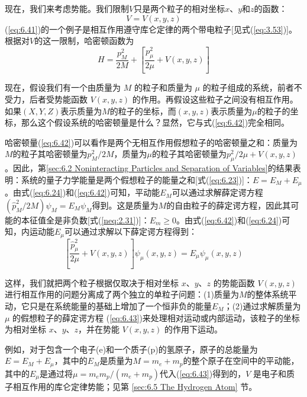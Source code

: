    现在，我们来考虑势能。我们限制$V$只是两个粒子的相对坐标$x$、$y$和$z$的函数：
    \begin{equation}
        V = V\left(x,y,z\right)
        \label{eq:6.41}
    \end{equation}
    (\ref{eq:6.41})的一个例子是相互作用遵守库仑定律的两个带电粒子[见式(\ref{eq:3.53})]。根据对$V$的这一限制，哈密顿函数为
    \begin{equation}
        H = \frac{p_M^2}{2M} + \left[\frac{p_{\mu}^2}{2\mu} + V\left(x,y,z\right)\right]
        \label{eq:6.42}
    \end{equation}

    现在，假设我们有一个由质量为 $M$ 的粒子和质量为 $\mu$ 的粒子组成的系统，前者不受力，后者受势能函数 $V\left(x,y,z\right)$ 的作用。再假设这些粒子之间没有相互作用。如果$\left(X,Y,Z\right)$表示质量为$M$的粒子的坐标，而$\left(x,y,z\right)$表示质量为$\mu$的粒子的坐标，那么这个假设系统的哈密顿量是什么？显然，它与式(\ref{eq:6.42})完全相同。

    哈密顿量(\ref{eq:6.42})可以看作是两个无相互作用假想粒子的哈密顿量之和：质量为$M$的粒子其哈密顿量为$p_M^2/2M$，质量为$\mu$的粒子其哈密顿量为$p_{\mu}^2/2\mu + V\left(x,y,z\right)$。因此，第\ref{sec:6.2 Noninteracting Particles and Separation of Variables}的结果表明：系统的量子力学能量是两个假想粒子的能量之和[式(\ref{eq:6.23})]：$E = E_M + E_{\mu}$。由式(\ref{eq:6.24})和(\ref{eq:6.42})可知，平动能$E_M$可以通过求解薛定谔方程$\left(\hat{p}_M^2/2M\right)\psi_M = E_M\psi_M$得到。这是质量为$M$的自由粒子的薛定谔方程，因此其可能的本征值全是非负数[式(\ref{neq:2.31})]：$E_m \ge 0$。由式(\ref{eq:6.42})和(\ref{eq:6.24})可知，内运动能$E_{\mu}$可以通过求解以下薛定谔方程得到：
    \begin{equation}
        \left[\frac{\hat{p}_{\mu}^2}{2\mu} + V\left(x,y,z\right)\right]\psi_{\mu}\left(x,y,z\right) = E_{\mu}\psi_{\mu}\left(x,y,z\right)
        \label{eq:6.43}
    \end{equation}

    这样，我们就把两个粒子根据仅取决于相对坐标 $x$、$y$、$z$ 的势能函数 $V\left(x,y,z\right)$ 进行相互作用的问题分离成了两个独立的单粒子问题：(1)质量为$M$的整体系统平动，它只是在系统能量的基础上增加了一个恒非负的能量$E_M$；(2)通过求解质量为 $\mu$ 的假想粒子的薛定谔方程 (\ref{eq:6.43})来处理相对运动或内部运动，该粒子的坐标为相对坐标 $x$、$y$、$z$，并在势能 $V\left(x,y,z\right)$ 的作用下运动。

    例如，对于包含一个电子(e)和一个质子(p)的氢原子，原子的总能量为$E = E_M + E_{\mu}$，其中的$E_M$是质量为$M = m_e+m_p$的整个原子在空间中的平动能，其中的$E_{\mu}$是通过将$\mu = m_em_p/(m_e+m_p)$代入(\ref{eq:6.43})得到的，$V$ 是电子和质子相互作用的库仑定律势能；见第 \ref{sec:6.5 The Hydrogen Atom} 节。

